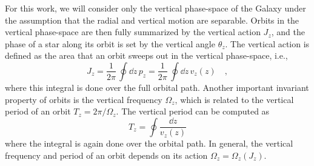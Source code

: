 For this work, we will consider only the vertical phase-space of the Galaxy under the
assumption that the radial and vertical motion are separable.
Orbits in the vertical phase-space are then fully summarized by the vertical action
$J_z$, and the phase of a star along its orbit is set by the vertical angle $\theta_z$.
The vertical action is defined as the area that an orbit sweeps out in the vertical
phase-space, i.e.,
\begin{equation}
    J_z = \frac{1}{2\pi} \, \oint \dd z \, p_z =
        \frac{1}{2\pi} \, \oint \dd z \, v_z(z) \quad, \label{eq:Jz}
\end{equation}
where this integral is done over the full orbital path.
Another important invariant property of orbits is the vertical frequency $\Omega_z$,
which is related to the vertical period of an orbit $T_z = 2\pi / \Omega_z$.
The vertical period can be computed as
\begin{equation}
    T_z = \oint \frac{\dd z}{v_z(z)} \label{eq:Tz}
\end{equation}
where the integral is again done over the orbital path.
In general, the vertical frequency and period of an orbit depends on its action
$\Omega_z = \Omega_z(J_z)$.







